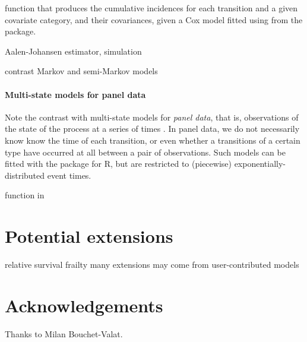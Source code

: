 \documentclass[nojss,nofooter]{jss}
\begin{document}
function  that produces the cumulative incidences for each transition and a given covariate category, and their covariances, given a Cox model fitted using  from the  package. 

Aalen-Johansen estimator,  simulation

contrast Markov and semi-Markov models

\paragraph{Multi-state models for panel data}

Note the contrast with multi-state models for \emph{panel data}, that is,
observations of the state of the process at a series of times
\citep{kalbfleisch:lawless}.  In panel data, we do not necessarily
know know the time of each transition, or even whether a transitions
of a certain type have occurred at all between a pair of observations.
Such models can be fitted with the  package for R, but are
restricted to (piecewise) exponentially-distributed event times.



 function in  


\section{Potential extensions}

relative survival
frailty 
many extensions may come from user-contributed models


\appendix
\section{Acknowledgements}
Thanks to Milan Bouchet-Valat.


\end{document}
